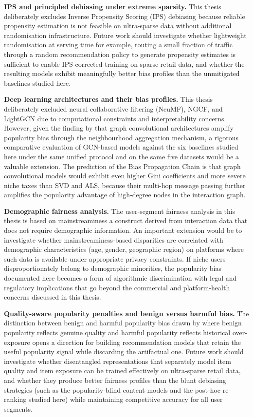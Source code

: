 \documentclass[11pt,a4paper]{report}
\begin{document}
\textbf{IPS and principled debiasing under extreme sparsity.} This thesis deliberately excludes Inverse Propensity Scoring (IPS) debiasing because reliable propensity estimation is not feasible on ultra-sparse data without additional randomisation infrastructure. Future work should investigate whether lightweight randomisation at serving time for example, routing a small fraction of traffic through a random recommendation policy to generate propensity estimates is sufficient to enable IPS-corrected training on sparse retail data, and whether the resulting models exhibit meaningfully better bias profiles than the unmitigated baselines studied here.

\textbf{Deep learning architectures and their bias profiles.} This thesis deliberately excluded neural collaborative filtering (NeuMF), NGCF, and LightGCN due to computational constraints and interpretability concerns. However, given the finding by \citet{chen2024gcnamplifypopularity} that graph convolutional architectures amplify popularity bias through the neighbourhood aggregation mechanism, a rigorous comparative evaluation of GCN-based models against the six baselines studied here under the same unified protocol and on the same five datasets would be a valuable extension. The prediction of the Bias Propagation Chain is that graph convolutional models would exhibit even higher Gini coefficients and more severe niche taxes than SVD and ALS, because their multi-hop message passing further amplifies the popularity advantage of high-degree nodes in the interaction graph.

\textbf{Demographic fairness analysis.} The user-segment fairness analysis in this thesis is based on mainstreaminess a construct derived from interaction data that does not require demographic information. An important extension would be to investigate whether mainstreaminess-based disparities are correlated with demographic characteristics (age, gender, geographic region) on platforms where such data is available under appropriate privacy constraints. If niche users disproportionately belong to demographic minorities, the popularity bias documented here becomes a form of algorithmic discrimination with legal and regulatory implications that go beyond the commercial and platform-health concerns discussed in this thesis.

\textbf{Quality-aware popularity penalties and benign versus harmful bias.} The distinction between benign and harmful popularity bias drawn by \citet{zhao2022benignharmful} where benign popularity reflects genuine quality and harmful popularity reflects historical over-exposure opens a direction for building recommendation models that retain the useful popularity signal while discarding the artifactual one. Future work should investigate whether disentangled representations that separately model item quality and item exposure can be trained effectively on ultra-sparse retail data, and whether they produce better fairness profiles than the blunt debiasing strategies (such as the popularity-blind content models and the post-hoc re-ranking studied here) while maintaining competitive accuracy for all user segments.
\end{document}
